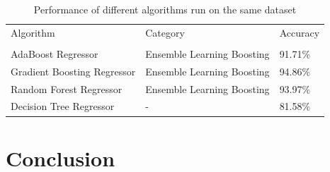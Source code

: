 \documentclass[journal,twoside,web]{ieeecolor}
\begin{document}
\begin{table}[!ht]
    \caption{Performance of different algorithms run on the same dataset}
    \label{tab:summary}
	\centering
    \begin{tabular}{l l l}
    \toprule
    \multirow{1}{*}{Algorithm} & \multirow{1}{*}{Category} & \multirow{1}{*}{Accuracy} \\ 
    && \\ \midrule
    AdaBoost Regressor & Ensemble Learning Boosting & 91.71\% \\ \midrule
    Gradient Boosting Regressor & Ensemble Learning Boosting & 94.86\% \\ \midrule
    Random Forest Regressor & Ensemble Learning Boosting & 93.97\% \\ \midrule
    Decision Tree Regressor & - & 81.58\% \\
    \bottomrule
    \end{tabular}
\end{table}

\section{Conclusion}
\label{sec:conclusion}



\end{document}
